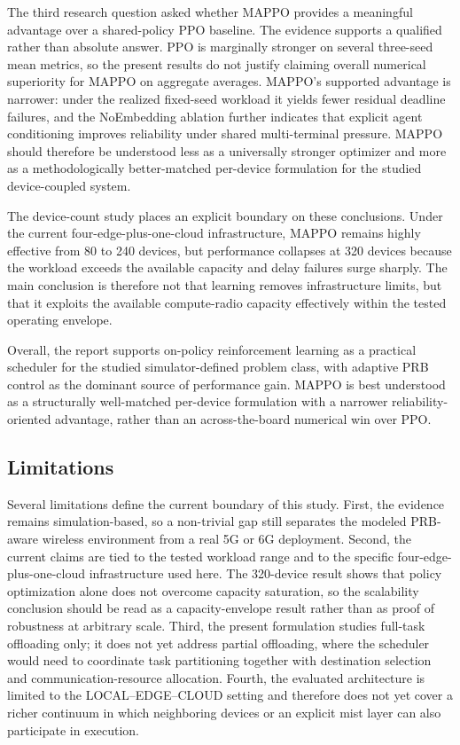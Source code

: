 The third research question asked whether MAPPO provides a meaningful advantage over a shared-policy PPO baseline. The evidence supports a qualified rather than absolute answer. PPO is marginally stronger on several three-seed mean metrics, so the present results do not justify claiming overall numerical superiority for MAPPO on aggregate averages. MAPPO's supported advantage is narrower: under the realized fixed-seed workload it yields fewer residual deadline failures, and the NoEmbedding ablation further indicates that explicit agent conditioning improves reliability under shared multi-terminal pressure. MAPPO should therefore be understood less as a universally stronger optimizer and more as a methodologically better-matched per-device formulation for the studied device-coupled system.

The device-count study places an explicit boundary on these conclusions. Under the current four-edge-plus-one-cloud infrastructure, MAPPO remains highly effective from 80 to 240 devices, but performance collapses at 320 devices because the workload exceeds the available capacity and delay failures surge sharply. The main conclusion is therefore not that learning removes infrastructure limits, but that it exploits the available compute-radio capacity effectively within the tested operating envelope.

Overall, the report supports on-policy reinforcement learning as a practical scheduler for the studied simulator-defined problem class, with adaptive PRB control as the dominant source of performance gain. MAPPO is best understood as a structurally well-matched per-device formulation with a narrower reliability-oriented advantage, rather than an across-the-board numerical win over PPO.

\subsection{Limitations}
\label{subsec:conclusion-limitations}

Several limitations define the current boundary of this study. First, the evidence remains simulation-based, so a non-trivial gap still separates the modeled PRB-aware wireless environment from a real 5G or 6G deployment. Second, the current claims are tied to the tested workload range and to the specific four-edge-plus-one-cloud infrastructure used here. The 320-device result shows that policy optimization alone does not overcome capacity saturation, so the scalability conclusion should be read as a capacity-envelope result rather than as proof of robustness at arbitrary scale. Third, the present formulation studies full-task offloading only; it does not yet address partial offloading, where the scheduler would need to coordinate task partitioning together with destination selection and communication-resource allocation. Fourth, the evaluated architecture is limited to the LOCAL--EDGE--CLOUD setting and therefore does not yet cover a richer continuum in which neighboring devices or an explicit mist layer can also participate in execution.

